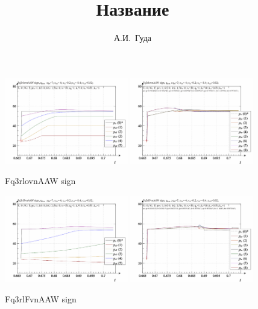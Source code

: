 \documentclass[a4paper,10pt]{article}
\title{Название}
\author{А.И.~Гуда}
\begin{document}
\begin{figure}[htb!]
  \centerline{
    \includegraphics[width=0.48\textwidth]{qls-p_t_pi_m_Fq3rlovnAAW_sign.png}
    \hfill
    \includegraphics[width=0.48\textwidth]{qls-p_t_p_m_Fq3rlovnAAW_sign.png}
  }
  \caption{Fq3rlovnAAW sign}
  \label{atu:fig1}
\end{figure}

\vspace{-3ex}

\begin{figure}[htb!]
  \centerline{
    \includegraphics[width=0.48\textwidth]{qls-p_t_pi_m_Fq3rlFvnAAW_sign.png}
    \hfill
    \includegraphics[width=0.48\textwidth]{qls-p_t_p_m_Fq3rlFvnAAW_sign.png}
  }
  \caption{Fq3rlFvnAAW sign}
  \label{atu:fig2}
\end{figure}
\end{document}
